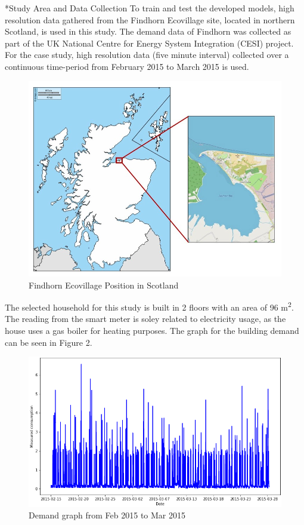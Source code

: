 \documentclass[twocolumn, a4paper,10pt]{article}
\makeatletter
\renewcommand\section{\@startsection{section}{1}{\z@}{0.25cm}{0.1cm}{\normalfont\large\bfseries}}
\makeatother
\begin{document}
\section*{Study Area and Data Collection}
To train and test the developed models, high resolution data gathered from the Findhorn Ecovillage site, located in northern Scotland, is used in this study. The demand data of Findhorn was collected as part of the UK National Centre for Energy System Integration (CESI) project. For the case study, high resolution data (five minute interval) collected over a continuous time-period from February 2015 to March 2015 is used.

\begin{figure}[ht]
    \centering
    \includegraphics[scale=0.28]{img/Finhorn_Postion.jpg}
    \caption{Findhorn Ecovillage Position in Scotland}
    \label{fig:Finhorn_Postion}
\end{figure}

The selected household for this study is built in 2 floors with an area of 96 m\textsuperscript{2}. The reading from the smart meter is soley related to electricity usage, as the house uses a gas boiler for heating purposes. The graph for the building demand can be seen in Figure 2.

\begin{figure}[ht]
    \centering
    \includegraphics[scale=0.3]{img/edp_graph.png}
    \caption{Demand graph from Feb 2015 to Mar 2015}
    \label{fig:edp_graph}
\end{figure}
\end{document}
